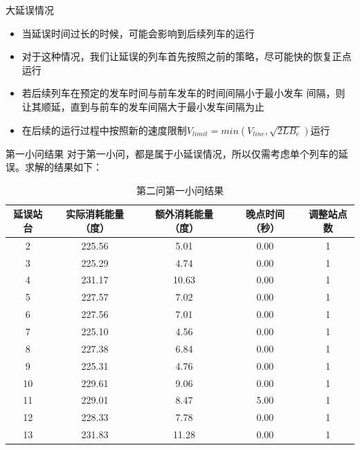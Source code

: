 \documentclass{beamer}
\begin{document}
\begin{frame}{大延误情况}
\begin{itemize}
  \item<1-> 当延误时间过长的时候，可能会影响到后续列车的运行
  \item<2-> 对于这种情况，我们让延误的列车首先按照之前的策略，尽可能快的恢复正点运行
  \item<3-> 若后续列车在预定的发车时间与前车发车的时间间隔小于最小发车
  间隔，则让其顺延，直到与前车的发车间隔大于最小发车间隔为止
  \item<4-> 在后续的运行过程中按照新的速度限制$V_{limit} = min(V_{line}, \sqrt{2LB_e})$运行
\end{itemize}
\end{frame}

\begin{frame}{第一小问结果}
对于第一小问，都是属于小延误情况，所以仅需考虑单个列车的延误。求解的结果如下：
\begin{table} \tiny
  \centering
  \caption{第二问第一小问结果}
  \begin{tabular}{ccccc}
  \hline
  延误站台 & 实际消耗能量（度） & 额外消耗能量（度） & 晚点时间（秒） & 调整站点数 \\
  \hline
  2 & 225.56 & 5.01 & 0.00 & 1 \\
  3 & 225.29 & 4.74 & 0.00 & 1 \\
  4 & 231.17 & 10.63 & 0.00 & 1 \\
  5 & 227.57 & 7.02 & 0.00 & 1 \\
  6 & 227.56 & 7.01 & 0.00 & 1 \\
  7 & 225.10 & 4.56 & 0.00 & 1 \\
  8 & 227.38 & 6.84 & 0.00 & 1 \\
  9 & 225.31 & 4.76 & 0.00 & 1 \\
  10 & 229.61 & 9.06 & 0.00 & 1 \\
  11 & 229.01 & 8.47 & 5.00 & 1 \\
  12 & 228.33 & 7.78 & 0.00 & 1 \\
  13 & 231.83 & 11.28 & 0.00 & 1 \\
  \hline
\end{tabular}
  \label{p2sub1}
\end{table}
\end{frame}
\end{document}
